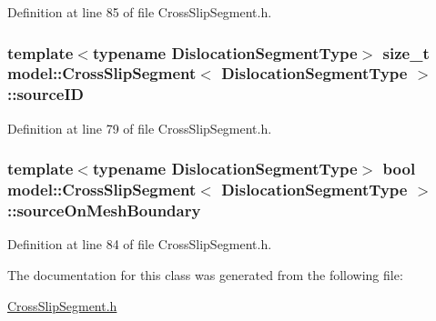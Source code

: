 Definition at line 85 of file Cross\+Slip\+Segment.\+h.

\hypertarget{classmodel_1_1_cross_slip_segment_a0a277b3268dcf7ba49ddd61daefb96ac}{}
\subsubsection[{source\+I\+D}]{\setlength{\rightskip}{0pt plus 5cm}template$<$typename Dislocation\+Segment\+Type$>$ size\+\_\+t {\bf model\+::\+Cross\+Slip\+Segment}$<$ Dislocation\+Segment\+Type $>$\+::source\+I\+D}\label{classmodel_1_1_cross_slip_segment_a0a277b3268dcf7ba49ddd61daefb96ac}


Definition at line 79 of file Cross\+Slip\+Segment.\+h.

\hypertarget{classmodel_1_1_cross_slip_segment_abeda92bda81b647ea7aabda31427c748}{}
\subsubsection[{source\+On\+Mesh\+Boundary}]{\setlength{\rightskip}{0pt plus 5cm}template$<$typename Dislocation\+Segment\+Type$>$ bool {\bf model\+::\+Cross\+Slip\+Segment}$<$ Dislocation\+Segment\+Type $>$\+::source\+On\+Mesh\+Boundary}\label{classmodel_1_1_cross_slip_segment_abeda92bda81b647ea7aabda31427c748}


Definition at line 84 of file Cross\+Slip\+Segment.\+h.



The documentation for this class was generated from the following file\+:\begin{DoxyCompactItemize}
\item 
\hyperlink{_cross_slip_segment_8h}{Cross\+Slip\+Segment.\+h}\end{DoxyCompactItemize}
